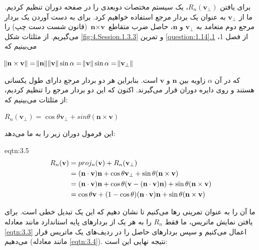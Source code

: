 {\begin{spacing}{1.5}
        برای یافتن $R_{n}(\textbf{v}_{\perp})$، یک سیستم مختصات دوبعدی را در صفحه دوران تنظیم کردیم.
        ما از $\textbf{v}_{\perp}$ به عنوان یک بردار مرجع استفاده خواهیم کرد.
        برای به دست آوردن یک بردار مرجع دوم متعامد به $\textbf{v}_{\perp}$ و $\textbf{n}$،
        حاصل ضرب متقاطع $\textbf{n}\times\textbf{v}$ (قانون شست دست چپ) را می‌گیریم. از مثلثات شکل \ref{fig:4.Session.1.3.3} و تمرین \hyperref[question:1.14]{\ref{question:1.14}.1} از فصل 1، می‌بینیم که

        \begin{center}
            $\norm{\textbf{n}\times\textbf{v}}=\norm{\textbf{n}}\norm{\textbf{v}}\sin\alpha=\norm{\textbf{v}}\sin\alpha=\norm{\textbf{v}_{\perp}}$
        \end{center}

        که در آن $\alpha$ زاویه بین $\textbf{n}$ و $\textbf{v}$ است.
        بنابراین هر دو بردار مرجع دارای طول یکسانی هستند و روی دایره دوران قرار می‌گیرند.
        اکنون که این دو بردار مرجع را تنظیم کردیم، از مثلثات می‌بینیم که:

        \begin{center}
            $R_{n}(\textbf{v}_{\perp})=\cos\theta\textbf{v}_{\perp}+sin\theta(\textbf{n}\times\textbf{v})$
        \end{center}

        این فرمول دوران زیر را به ما می‌دهد:

        \begin{eqtn}{eqtn:3.5}
            \centering
            \begin{equation*}
                \centering
                \begin{split}
                    R_{n}(\textbf{v})&=proj_{n}(\textbf{v})+R_{n}(\textbf{v}_{\perp})\\
                    &=(\textbf{n}\cdot\textbf{v})\textbf{n}+\cos\theta\textbf{v}_{\perp}+\sin\theta(\textbf{n}\times\textbf{v})\\
                    &=(\textbf{n}\cdot\textbf{v})\textbf{n}+\cos\theta(\textbf{v}-(\textbf{n}\cdot\textbf{v})\textbf{n})+\sin\theta(\textbf{n}\times\textbf{v})\\
                    &=\cos\theta\textbf{v}+(1-\cos\theta)(\textbf{n}\cdot\textbf{v})\textbf{n}+\sin\theta(\textbf{n}\times\textbf{v})
                \end{split}
            \end{equation*}
        \end{eqtn}

        ما آن را به عنوان تمرینی رها می‌کنیم تا نشان دهیم که این یک تبدیل خطی است.
        برای یافتن نمایش ماتریس، ما فقط $R_{n}$ را به هر یک از بردارهای پایه استاندارد مانند معادله \ref{eqtn:3.3} اعمال می‌کنیم و سپس بردارهای حاصل را در ردیف‌های یک ماتریس قرار می‌دهیم (مانند معادله \ref{eqtn:3.4}).
        نتیجه نهایی این است:


\end{spacing}}
